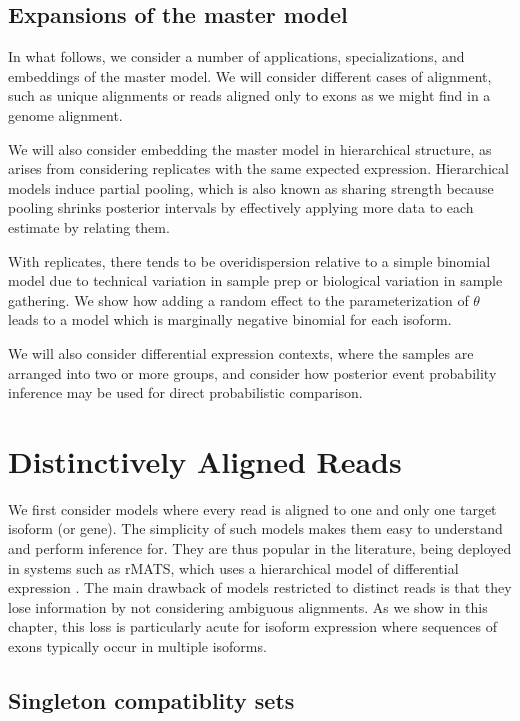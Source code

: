 \documentclass[11pt]{report}
\begin{document}
\section{Expansions of the master model}

In what follows, we consider a number of applications,
specializations, and embeddings of the master model. We will consider
different cases of alignment, such as unique alignments or reads
aligned only to exons as we might find in a genome alignment.

We will also consider embedding the master model in hierarchical
structure, as arises from considering replicates with the same
expected expression.  Hierarchical models induce partial pooling,
which is also known as sharing strength because pooling shrinks
posterior intervals by effectively applying more data to each estimate
by relating them.

With replicates, there tends to be overidispersion relative to a
simple binomial model due to technical variation in sample prep or
biological variation in sample gathering.  We show how adding a random
effect to the parameterization of $\theta$ leads to a model which is
marginally negative binomial for each isoform.

We will also consider differential expression contexts, where the
samples are arranged into two or more groups, and consider how
posterior event probability inference may be used for direct
probabilistic comparison.


\chapter{Distinctively Aligned Reads}

We first consider models where every read is aligned to one and only
one target isoform (or gene).  The simplicity of such models makes
them easy to understand and perform inference for.  They are thus
popular in the literature, being deployed in systems such as rMATS,
which uses a hierarchical model of differential expression
\citep{shen2014rmats}.  The main drawback of models restricted to
distinct reads is that they lose information by not considering
ambiguous alignments.  As we show in this chapter, this loss is
particularly acute for isoform expression where sequences of exons
typically occur in multiple isoforms.

\section{Singleton compatiblity sets}
\end{document}
